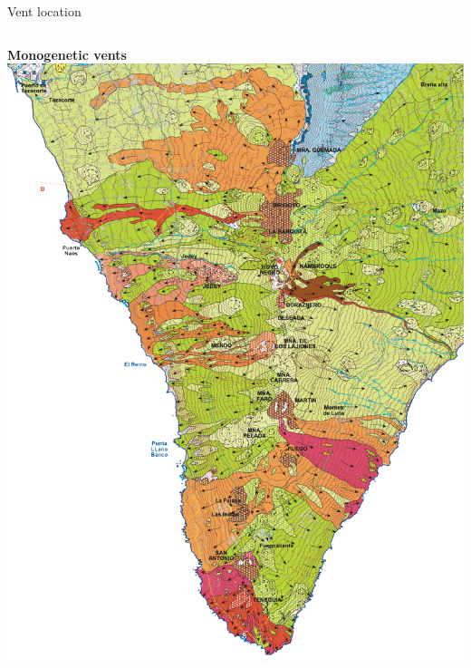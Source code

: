 \documentclass[10pt,aspectratio=169]{beamer}
\begin{document}
\begin{frame}{Vent location}
    \begin{columns}[T]
      \begin{column}{0.5\textwidth}	
        \centering \textbf{Monogenetic vents}\\ \vspace*{1em}
        \centering\includegraphics[width=.85\textwidth]{img/lapalma.png}
      \end{column}


\end{columns}
\end{frame}
\end{document}
